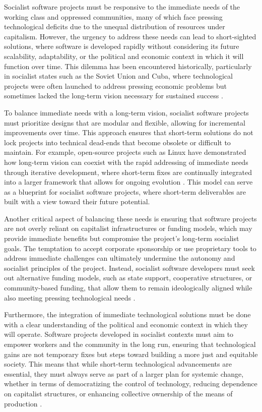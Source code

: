 \begin{refsection}
Socialist software projects must be responsive to the immediate needs of the working class and oppressed communities, many of which face pressing technological deficits due to the unequal distribution of resources under capitalism. However, the urgency to address these needs can lead to short-sighted solutions, where software is developed rapidly without considering its future scalability, adaptability, or the political and economic context in which it will function over time. This dilemma has been encountered historically, particularly in socialist states such as the Soviet Union and Cuba, where technological projects were often launched to address pressing economic problems but sometimes lacked the long-term vision necessary for sustained success \cite[pp.~200-204]{nove1991}.

To balance immediate needs with a long-term vision, socialist software projects must prioritize designs that are modular and flexible, allowing for incremental improvements over time. This approach ensures that short-term solutions do not lock projects into technical dead-ends that become obsolete or difficult to maintain. For example, open-source projects such as Linux have demonstrated how long-term vision can coexist with the rapid addressing of immediate needs through iterative development, where short-term fixes are continually integrated into a larger framework that allows for ongoing evolution \cite[pp.~147-150]{raymond2022}. This model can serve as a blueprint for socialist software projects, where short-term deliverables are built with a view toward their future potential.

Another critical aspect of balancing these needs is ensuring that software projects are not overly reliant on capitalist infrastructures or funding models, which may provide immediate benefits but compromise the project’s long-term socialist goals. The temptation to accept corporate sponsorship or use proprietary tools to address immediate challenges can ultimately undermine the autonomy and socialist principles of the project. Instead, socialist software developers must seek out alternative funding models, such as state support, cooperative structures, or community-based funding, that allow them to remain ideologically aligned while also meeting pressing technological needs \cite[pp.~245-248]{mueller2010}.

Furthermore, the integration of immediate technological solutions must be done with a clear understanding of the political and economic context in which they will operate. Software projects developed in socialist contexts must aim to empower workers and the community in the long run, ensuring that technological gains are not temporary fixes but steps toward building a more just and equitable society. This means that while short-term technological advancements are essential, they must always serve as part of a larger plan for systemic change, whether in terms of democratizing the control of technology, reducing dependence on capitalist structures, or enhancing collective ownership of the means of production \cite[pp.~78-81]{ernesto1968}.


\end{refsection}
